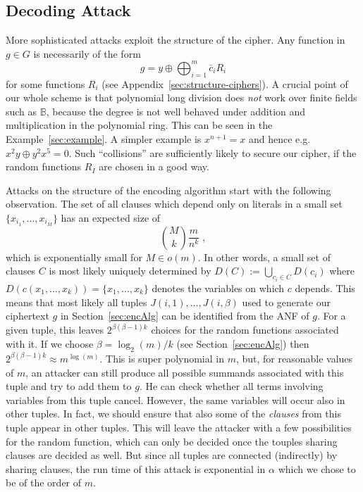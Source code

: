 \documentclass[final,journal,compsoc]{IEEEtran}
\begin{document}
\subsection{Decoding Attack\label{sec:decoding-attack}}

More sophisticated attacks exploit the structure of
the cipher. 
Any function in $g \in G$ is necessarily of the form
\[
g = y \oplus \bigoplus_{i=1}^m \bar c_i R_i
\]
for some functions $R_i$ (see
Appendix~\ref{sec:structure-ciphers}). 
A crucial point of our whole scheme is that polynomial long division
does \emph{not} work over finite fields such as $\mathbb B$, because
the degree is not well behaved under addition and multiplication in
the polynomial ring.  This can be seen in the
Example~\ref{sec:example}.  A simpler example is $x^{n+1}=x$ and hence
e.g.\ $x^2y \oplus y^2 x^5 =0$.  Such ``collisions'' are sufficiently
likely to secure our cipher, if the random functions $R_I$ are chosen
in a good way.


Attacks on the structure of the encoding algorithm start with
the following observation.
The set of all clauses which depend only on literals in a small set
$\{x_{i_1},\ldots, x_{i_{M}}\}$ has an expected size of
\begin{equation}
\binom{M}{k}\frac{m}{n^k}\;,
\end{equation}
which is exponentially small for $M\in o(m)$. In other words, a small
set of clauses $C$ is most likely uniquely determined by $D(C) :=
\bigcup_{c_i\in C}D(c_i)$ where
$D(c(x_1,\ldots,x_k))=\{x_1,\ldots,x_k\}$ denotes the variables on
which $c$ depends. This means that most likely all tuples
$J(i,1),\ldots, J(i,\beta)$ used to
generate our ciphertext $g$ in Section~\ref{sec:encAlg} can be identified
from the ANF of $g$. For a given tuple,
this leaves $2^{\beta(\beta-1)k}$ choices for the random functions
associated with it. 
If we choose $\beta = \log_2(m)/k$ (see Section~\ref{sec:encAlg}) then
$2^{\beta(\beta-1)k} \approx m^{\log(m)}$. This is super polynomial in
$m$, but, for reasonable values of $m$, an attacker can still produce all possible summands associated with
this tuple and try to add them to $g$. He can check whether all terms
involving variables from this tuple cancel. However, the same
variables will occur also in other tuples. In fact, we
should ensure that also some of the \emph{clauses} from this tuple appear in
other tuples. This will leave the attacker with a few possibilities for the random
function, which can only be decided once the touples sharing clauses are
decided as well. But since all tuples are connected
(indirectly) by sharing clauses, the run time of this attack is
exponential in $\alpha$ which we chose to be of the order of $m$.
\end{document}
